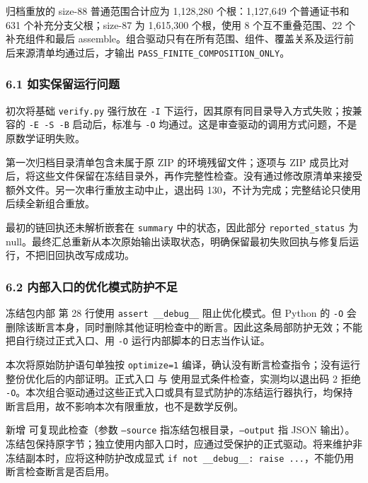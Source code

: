 \documentclass[
  11pt,
  a4paper,
]{article}
\begin{document}
归档重放的 size-88 普通范围合计应为 1,128,280 个根：1,127,649
个普通证书和 631 个补充分支父根；size-87 为 1,615,300 个根，使用 8
个互不重叠范围、22 个补充组件和最后
assemble。组合驱动只有在所有范围、组件、覆盖关系及运行前后来源清单均通过后，才输出
\texttt{PASS\_FINITE\_COMPOSITION\_ONLY}。

\hypertarget{ux5982ux5b9eux4fddux7559ux8fd0ux884cux95eeux9898}{%
\subsubsection{6.1
如实保留运行问题}\label{ux5982ux5b9eux4fddux7559ux8fd0ux884cux95eeux9898}}

初次将基础 \texttt{verify.py} 强行放在 \texttt{-I}
下运行，因其原有同目录导入方式失败；按兼容的 \texttt{-E\ -S\ -B}
启动后，标准与 \texttt{-O}
均通过。这是审查驱动的调用方式问题，不是原数学证明失败。

第一次归档目录清单包含未属于原 ZIP 的环境残留文件；逐项与 ZIP
成员比对后，将这些文件保留在冻结目录外，再作完整性检查。没有通过修改原清单来接受额外文件。另一次串行重放主动中止，退出码
130，不计为完成；完整结论只使用后续全新组合重放。

最初的链回执还未解析嵌套在 \texttt{summary} 中的状态，因此部分
\texttt{reported\_status} 为
null。最终汇总重新从本次原始输出读取状态，明确保留最初失败回执与修复后运行，不把旧回执改写成成功。

\subsubsection{6.2 内部入口的优化模式防护不足}
冻结包内部  第 28 行使用
\texttt{assert \_\_debug\_\_} 阻止优化模式。但 Python 的 \texttt{-O}
会删除该断言本身，同时删除其他证明检查中的断言。因此这条局部防护无效；不能把自行绕过正式入口、用 \texttt{-O} 运行内部脚本的日志当作认证。

本次将原始防护语句单独按 \texttt{optimize=1} 编译，确认没有断言检查指令；没有运行整份优化后的内部证明。正式入口  与  使用显式条件检查，实测均以退出码 2 拒绝 \texttt{-O}。本次组合驱动通过这些正式入口或具有显式防护的冻结运行器执行，均保持断言启用，故不影响本次有限重放，也不是数学反例。

新增  可复现此检查（参数 \texttt{--source} 指冻结包根目录，\texttt{--output} 指 JSON 输出）。冻结包保持原字节；独立使用内部入口时，应通过受保护的正式驱动。将来维护非冻结副本时，应将这种防护改成显式 \texttt{if not \_\_debug\_\_: raise ...}，不能仍用断言检查断言是否启用。
\end{document}
